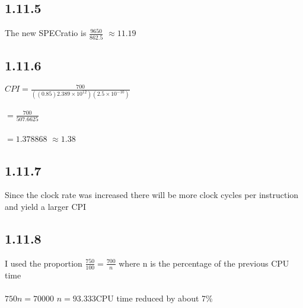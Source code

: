 \documentclass[12pt,letterpaper]{article}
\begin{document}
\subsection*{1.11.5}
The new SPECratio is $\frac{9650}{862.5}$ \indent $\approx 11.19$
\subsection*{1.11.6}
$CPI = \frac{700}{((0.85)2.389\times10^{12})(2.5\times10^{-10})}$\\\\
\indent $= \frac{700}{507.6625}$\\\\
\indent $= 1.378868$ \indent $\approx 1.38$
\subsection*{1.11.7}
Since the clock rate was increased there will be more clock cycles per instruction and yield a larger CPI
\subsection*{1.11.8}
I used the proportion $\frac{750}{100} = \frac{700}{n}$ where n is the percentage of the previous CPU time\\\\
$750n = 70000$ \indent $n = 93.333$\indent CPU time reduced by about 7\%
\end{document}
